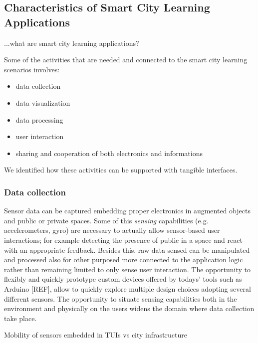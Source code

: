 \subsection{Characteristics of Smart City Learning Applications}

...what are smart city learning applications?

Some of the activities that are needed and connected to the smart city learning scenarios involves:

\begin{itemize} %
\item data collection
\item data visualization
\item data processing
\item user interaction
\item sharing and cooperation of both electronics and informations
\end{itemize}

We identified how these activities can be supported with tangible interfaces.

\subsubsection{Data collection}
Sensor data can be captured embedding proper electronics in augmented objects and public or private spaces.
Some of this \textit{sensing} capabilities (e.g. accelerometers, gyro) are necessary to actually allow sensor-based user interactions; for example detecting the presence of public in a space and react with an appropriate feedback. Besides this, raw data sensed can be manipulated and processed also for other purposed more connected to the application logic rather than remaining limited to only sense user interaction.
The opportunity to flexibly and quickly prototype custom devices offered by todays' tools such as Arduino [REF], allow to quickly explore multiple design choices adopting several different sensors.
The opportunity to situate sensing capabilities both in the environment and physically on the users widens the domain where data collection take place.

Mobility of sensors embedded in TUIs vs city infrastructure

